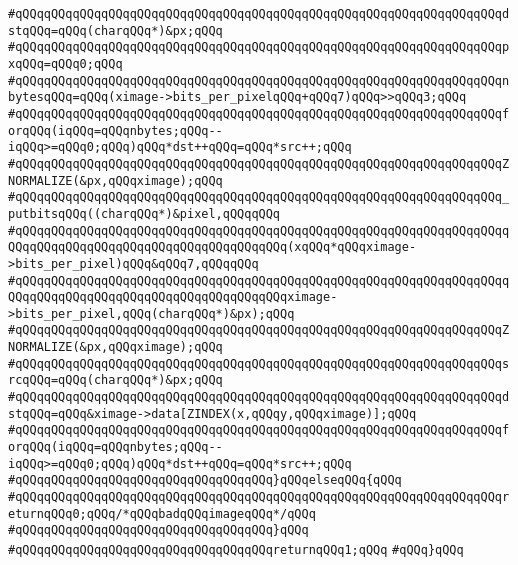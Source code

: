 \verb|#qQQqqQQqqQQqqQQqqQQqqQQqqQQqqQQqqQQqqQQqqQQqqQQqqQQqqQQqqQQqqQQqqQQqdstqQQq=qQQq(charqQQq*)&px;qQQq|\newline
\verb|#qQQqqQQqqQQqqQQqqQQqqQQqqQQqqQQqqQQqqQQqqQQqqQQqqQQqqQQqqQQqqQQqqQQqpxqQQq=qQQq0;qQQq|\newline
\verb|#qQQqqQQqqQQqqQQqqQQqqQQqqQQqqQQqqQQqqQQqqQQqqQQqqQQqqQQqqQQqqQQqqQQqnbytesqQQq=qQQq(ximage->bits_per_pixelqQQq+qQQq7)qQQq>>qQQq3;qQQq|\newline
\verb|#qQQqqQQqqQQqqQQqqQQqqQQqqQQqqQQqqQQqqQQqqQQqqQQqqQQqqQQqqQQqqQQqqQQqforqQQq(iqQQq=qQQqnbytes;qQQq--iqQQq>=qQQq0;qQQq)qQQq*dst++qQQq=qQQq*src++;qQQq|\newline
\verb|#qQQqqQQqqQQqqQQqqQQqqQQqqQQqqQQqqQQqqQQqqQQqqQQqqQQqqQQqqQQqqQQqqQQqZNORMALIZE(&px,qQQqximage);qQQq|\newline
\verb|#qQQqqQQqqQQqqQQqqQQqqQQqqQQqqQQqqQQqqQQqqQQqqQQqqQQqqQQqqQQqqQQqqQQq_putbitsqQQq((charqQQq*)&pixel,qQQqqQQq|\newline
\verb|#qQQqqQQqqQQqqQQqqQQqqQQqqQQqqQQqqQQqqQQqqQQqqQQqqQQqqQQqqQQqqQQqqQQqqQQqqQQqqQQqqQQqqQQqqQQqqQQqqQQqqQQqqQQq(xqQQq*qQQqximage->bits_per_pixel)qQQq&qQQq7,qQQqqQQq|\newline
\verb|#qQQqqQQqqQQqqQQqqQQqqQQqqQQqqQQqqQQqqQQqqQQqqQQqqQQqqQQqqQQqqQQqqQQqqQQqqQQqqQQqqQQqqQQqqQQqqQQqqQQqqQQqqQQqximage->bits_per_pixel,qQQq(charqQQq*)&px);qQQq|\newline
\verb|#qQQqqQQqqQQqqQQqqQQqqQQqqQQqqQQqqQQqqQQqqQQqqQQqqQQqqQQqqQQqqQQqqQQqZNORMALIZE(&px,qQQqximage);qQQq|\newline
\verb|#qQQqqQQqqQQqqQQqqQQqqQQqqQQqqQQqqQQqqQQqqQQqqQQqqQQqqQQqqQQqqQQqqQQqsrcqQQq=qQQq(charqQQq*)&px;qQQq|\newline
\verb|#qQQqqQQqqQQqqQQqqQQqqQQqqQQqqQQqqQQqqQQqqQQqqQQqqQQqqQQqqQQqqQQqqQQqdstqQQq=qQQq&ximage->data[ZINDEX(x,qQQqy,qQQqximage)];qQQq|\newline
\verb|#qQQqqQQqqQQqqQQqqQQqqQQqqQQqqQQqqQQqqQQqqQQqqQQqqQQqqQQqqQQqqQQqqQQqforqQQq(iqQQq=qQQqnbytes;qQQq--iqQQq>=qQQq0;qQQq)qQQq*dst++qQQq=qQQq*src++;qQQq|\newline
\verb|#qQQqqQQqqQQqqQQqqQQqqQQqqQQqqQQqqQQq}qQQqelseqQQq{qQQq|\newline
\verb|#qQQqqQQqqQQqqQQqqQQqqQQqqQQqqQQqqQQqqQQqqQQqqQQqqQQqqQQqqQQqqQQqqQQqreturnqQQq0;qQQq/*qQQqbadqQQqimageqQQq*/qQQq|\newline
\verb|#qQQqqQQqqQQqqQQqqQQqqQQqqQQqqQQqqQQq}qQQq|\newline
\verb|#qQQqqQQqqQQqqQQqqQQqqQQqqQQqqQQqqQQqreturnqQQq1;qQQq|\newline
\verb|#qQQq}qQQq|\newline
\newline
\newline

